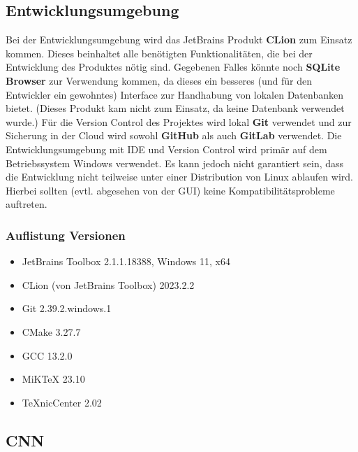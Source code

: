 \subsection{Entwicklungsumgebung}
\label{sec:AnalyseEntwicklungsumgebung}
Bei der Entwicklungsumgebung wird das JetBrains Produkt \textbf{CLion} zum Einsatz kommen. Dieses beinhaltet alle benötigten Funktionalitäten, die bei der Entwicklung des Produktes nötig sind. Gegebenen Falles könnte noch \textbf{SQLite Browser} zur Verwendung kommen, da dieses ein besseres (und für den Entwickler ein gewohntes) Interface zur Handhabung von lokalen Datenbanken bietet. (Dieses Produkt kam nicht zum Einsatz, da keine Datenbank verwendet wurde.) Für die Version Control des Projektes wird lokal \textbf{Git} verwendet und zur Sicherung in der Cloud wird sowohl \textbf{GitHub} als auch \textbf{GitLab} verwendet. Die Entwicklungsumgebung mit IDE und Version Control wird primär auf dem Betriebssystem Windows verwendet. Es kann jedoch nicht garantiert sein, dass die Entwicklung nicht teilweise unter einer Distribution von Linux ablaufen wird. Hierbei sollten (evtl. abgesehen von der GUI) keine Kompatibilitätsprobleme auftreten. 
\subsubsection{Auflistung Versionen}
\label{sec:AnalyseDevEnvAuflistung}
\begin{itemize}
	\item JetBrains Toolbox 2.1.1.18388, Windows 11, x64
	\item CLion (von JetBrains Toolbox) 2023.2.2
	\item Git 2.39.2.windows.1
	\item CMake 3.27.7
	\item GCC 13.2.0
	\item MiKTeX 23.10
	\item TeXnicCenter 2.02
\end{itemize}

\subsection{CNN}
\label{sec:AnalyseCNN}
